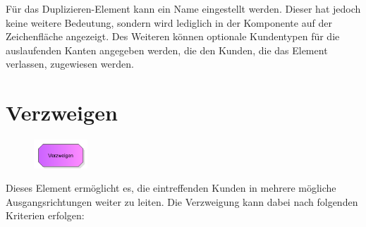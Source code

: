 Für das Duplizieren-Element kann ein Name eingestellt werden. Dieser hat jedoch keine weitere Bedeutung, sondern wird lediglich
in der Komponente auf der Zeichenfläche angezeigt. Des Weiteren können optionale Kundentypen für die auslaufenden Kanten angegeben
werden, die den Kunden, die das Element verlassen, zugewiesen werden.


\section{Verzweigen}
\label{ref:ModelElementDecide}

\begin{figure}
\vspace{-22pt}
\includegraphics[width=2cm]{imageModelElementDecide.png}
\vspace{-22pt}
\end{figure}

Dieses Element ermöglicht es, die eintreffenden Kunden in mehrere mögliche Ausgangsrichtungen weiter zu leiten.
Die Verzweigung kann dabei nach folgenden Kriterien erfolgen:

